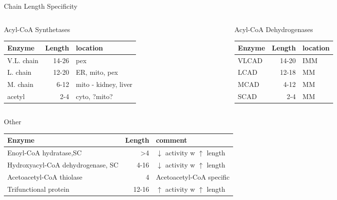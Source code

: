 \documentclass[presentation, smaller]{beamer}
\begin{document}
\begin{frame}[label={sec:orgheadline9}]{Chain Length Specificity}
\begin{columns}
\begin{column}{.5\columnwidth}
\begin{block}{Acyl-CoA Synthetases}
\scriptsize
\begin{center}
\begin{tabular}{lrl}
Enzyme & Length & location\\
\hline
V.L. chain & 14-26 & pex\\
L. chain & 12-20 & ER, mito, pex\\
M. chain & 6-12 & mito - kidney, liver\\
acetyl & 2-4 & cyto, ?mito?\\
\end{tabular}
\end{center}
\end{block}
\end{column}


\begin{column}{.5\columnwidth}
\begin{block}{Acyl-CoA Dehydrogenases}
\scriptsize
\begin{center}
\begin{tabular}{lrl}
Enzyme & Length & location\\
\hline
VLCAD & 14-20 & IMM\\
LCAD & 12-18 & MM\\
MCAD & 4-12 & MM\\
SCAD & 2-4 & MM\\
\end{tabular}
\end{center}
\end{block}
\end{column}
\end{columns}

\begin{block}{Other}
\scriptsize
\begin{center}
\begin{tabular}{lrl}
Enzyme & Length & comment\\
\hline
Enoyl-CoA hydratase,SC & >4 & \(\downarrow\) activity w \(\uparrow\) length\\
Hydroxyacyl-CoA dehydrogenase, SC & 4-16 & \(\downarrow\) activity w \(\uparrow\) length\\
Acetoacetyl-CoA thiolase & 4 & Acetoacetyl-CoA specific\\
Trifunctional protein & 12-16 & \(\uparrow\) activity w \(\uparrow\) length\\
\end{tabular}
\end{center}
\end{block}
\end{frame}
\end{document}
